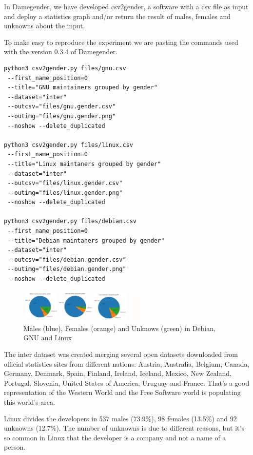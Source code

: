 \documentclass[a4paper]{article}
\begin{document}
In Damegender, we have developed csv2gender, a software with a csv
file as input and deploy a statistics graph and/or return the result
of males, females and unknowns about the input.

To make easy to reproduce the experiment we are pasting the commands
used with the version 0.3.4 of Damegender.

\begin{verbatim}
python3 csv2gender.py files/gnu.csv
 --first_name_position=0
 --title="GNU maintainers grouped by gender"
 --dataset="inter"
 --outcsv="files/gnu.gender.csv"
 --outimg="files/gnu.gender.png"
 --noshow --delete_duplicated

python3 csv2gender.py files/linux.csv
 --first_name_position=0
 --title="Linux maintaners grouped by gender"
 --dataset="inter"
 --outcsv="files/linux.gender.csv"
 --outimg="files/linux.gender.png"
 --noshow --delete_duplicated

python3 csv2gender.py files/debian.csv
 --first_name_position=0
 --title="Debian maintaners grouped by gender"
 --dataset="inter"
 --outcsv="files/debian.gender.csv"
 --outimg="files/debian.gender.png"
 --noshow --delete_duplicated
\end{verbatim}

\begin{figure}
  \centering
  \includegraphics[width=0.6\textwidth]{images/debian-gnu-linux.pdf}
  \caption[Caption for LOF]{Males (blue), Females (orange) and Unknows (green) in Debian, GNU and Linux}
\end{figure}

The inter dataset was created merging several open datasets downloaded
from official statistics sites from different nations: Austria,
Australia, Belgium, Canada, Germany, Denmark, Spain, Finland, Ireland,
Iceland, Mexico, New Zealand, Portugal, Slovenia, United States of
America, Uruguay and France. That's a good representation of the
Western World and the Free Software world is populating this world's
area\cite{gonzalez2008geographic}.

Linux divides the developers in 537 males (73.9\%), 98 females
(13.5\%) and 92 unknowns (12.7\%). The number of unknowns is due to
different reasons, but it's so common in Linux that the developer is a
company and not a name of a person.
\end{document}
